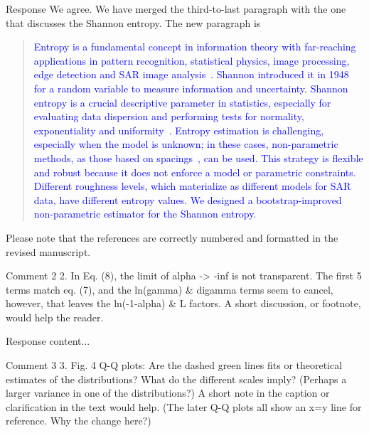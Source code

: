 \documentclass[11pt]{report}
\begin{document}
\begin{responsebox}{Response}
We agree.
We have merged the third-to-last paragraph with the one that discusses the Shannon entropy.
The new paragraph is
\begin{quote}
	\textcolor{blue}{Entropy is a fundamental concept in information theory with far-reaching applications in pattern recognition, statistical physics, image processing, edge detection and SAR image analysis~\cite{Presse2013,MohammadDjafari2015,Avval2021, Nascimento2014,Nascimento2019}. 
		Shannon introduced it in 1948~\cite{Shannon1948} for a random variable to measure information and uncertainty.
		Shannon entropy is a crucial descriptive parameter in statistics, especially for evaluating data dispersion and performing tests for normality, exponentiality and uniformity~\cite{Wieczorkowski1999,Zamanzade2012}. 
		Entropy estimation is challenging, especially when the model is unknown;
		in these cases, non-parametric methods, as those based on spacings~\cite{AlizadehNoughabi2010,Subhash2021}, can be used.
		This strategy is flexible and robust because it does not enforce a model or parametric constraints.
		Different roughness levels, which materialize as different models for SAR data, have different entropy values.
		We designed a bootstrap-improved non-parametric estimator for the Shannon entropy.}
\end{quote}
Please note that the references are correctly numbered and formatted in the revised manuscript.
\end{responsebox}

\begin{reviewbox}{Comment 2}
2. In Eq. (8), the limit of alpha -> -inf is not transparent. The first 5 terms match eq. (7), and the ln(gamma) \& digamma terms seem to cancel, however, that leaves the ln(-1-alpha) \& L factors. A short discussion, or footnote, would help the reader. 
\end{reviewbox}

\begin{responsebox}{Response}
	content...
\end{responsebox}

\begin{reviewbox}{Comment 3}
3. Fig. 4 Q-Q plots: Are the dashed green lines fits or theoretical estimates of the distributions? What do the different scales imply? (Perhaps a larger variance in one of the distributions?) A short note in the caption or clarification in the text would help. (The later Q-Q plots all show an x=y line for reference. Why the change here?)
\end{reviewbox}
\end{document}
